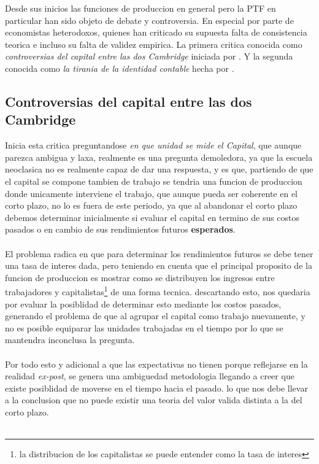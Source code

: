 \documentclass[11pt]{article}
\begin{document}
\begin{flushleft}
    Desde sus inicios las funciones de produccion en general pero la PTF en particular han sido objeto de debate y controversia. En especial por parte de economistas heterodoxos, 
    quienes han criticado su supuesta falta de consistencia teorica e incluso su falta de validez empirica.
    La primera critica conocida como \textit{controversias del capital entre las dos Cambridge} iniciada por \citet{robinson_1953}. 
    Y la segunda conocida como \textit{la tirania de la identidad contable} hecha por \citet{shaikh_1974}.

    \subsection{Controversias del capital entre las dos Cambridge}
    \citet{robinson_1953} Inicia esta critica preguntandose \textit{en que unidad se mide el Capital},
    que aunque parezca ambigua y laxa, realmente es una pregunta demoledora, ya que 
    la escuela neoclasica no es realmente capaz de dar una respuesta, y es que, partiendo de que el capital se compone tambien de trabajo
    se tendria una funcion de produccion donde unicamente interviene el trabajo, que aunque pueda ser coherente en el corto plazo,
    no lo es fuera de este periodo, ya que al abandonar el corto plazo debemos determinar inicialmente si evaluar el capital en termino
    de sus costos pasados o en cambio de sus rendimientos futuros \textbf{esperados}.
    \\~\\
    El problema radica en que para determinar los rendimientos futuros se debe tener 
    una tasa de interes dada, pero teniendo en cuenta que el principal proposito de la funcion de produccion 
    es mostrar como se distribuyen los ingresos entre trabajadores y capitalistas\footnote{la distribucion de los capitalistas se puede entender como la tasa de interes} de una forma tecnica.
    descartando esto, nos quedaria por evaluar la posiblidad de determinar esto mediante los costos pasados,
    generando el problema de que al agrupar el capital como trabajo nuevamente, y no es posible equiparar las unidades trabajadas en el tiempo por lo que se mantendra inconclusa la pregunta.
    \\~\\
    Por todo esto y adicional a que las expectativas no tienen porque reflejarse en la realidad \textit{ex-post},
    se genera una ambiguedad metodologia llegando a creer que existe posiblidad de moverse en el tiempo hacia el pasado.
    lo que nos debe llevar a la conclusion que no puede existir una teoria del valor valida distinta a la del corto plazo.
    \\~\\
    

\end{flushleft}
\end{document}
